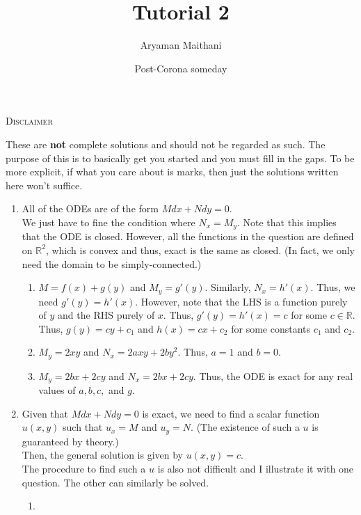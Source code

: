 \documentclass{article}
\title{Tutorial 2}				%
\author{Aryaman Maithani}
\date{Post-Corona someday}		%
\begin{document}
\maketitle

\hrulefill

\begin{center}
	\textsc{Disclaimer}
\end{center}
These are \textbf{not} complete solutions and should not be regarded as such. The purpose of this is to basically get you started and you must fill in the gaps. To be more explicit, if what you care about is marks, then just the solutions written here won't suffice.

\hrulefill

\begin{enumerate}[label = Q.\arabic*.] 
	\item All of the ODEs are of the form $Mdx + Ndy = 0.$\\
	We just have to fine the condition where $N_x = M_y.$ Note that this implies that the ODE is closed. However, all the functions in the question are defined on $\mathbb{R}^2$, which is convex and thus, exact is the same as closed. (In fact, we only need the domain to be simply-connected.)
	\begin{enumerate}[label = (\roman*)] 
		\item $M = f(x) + g(y)$ and $M_y = g'(y).$ Similarly, $N_x = h'(x).$ Thus, we need $g'(y) = h'(x).$ However, note that the LHS is a function purely of $y$ and the RHS purely of $x.$ Thus, $g'(y) = h'(x) = c$ for some $c \in \mathbb{R}.$ Thus, $g(y) = cy + c_1$ and $h(x) = cx + c_2$ for some constants $c_1$ and $c_2.$
		\item $M_y = 2xy$ and $N_x = 2axy + 2by^2.$ Thus, $a = 1$ and $b = 0.$
		\item $M_y = 2bx + 2cy$ and $N_x = 2bx + 2cy.$ Thus, the ODE is exact for any real values of $a, b, c,$ and $g.$
	\end{enumerate}
	\item Given that $Mdx + Ndy = 0$ is exact, we need to find a scalar function $u(x, y)$ such that $u_x = M$ and $u_y = N.$ (The existence of such a $u$ is guaranteed by theory.)\\
	Then, the general solution is given by $u(x, y) = c.$\\
	The procedure to find such a $u$ is also not difficult and I illustrate it with one question. The other can similarly be solved.
	\begin{enumerate}[label = (\roman*)] 
		\item 

\end{enumerate}
\end{enumerate}
\end{document}
